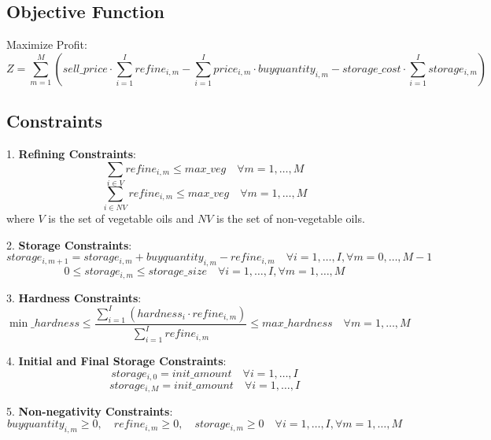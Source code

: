 \documentclass{article}
\begin{document}
\subsection*{Objective Function}

Maximize Profit:
\[
Z = \sum_{m=1}^{M} \left( sell\_price \cdot \sum_{i=1}^{I} refine_{i,m} - \sum_{i=1}^{I} price_{i,m} \cdot buyquantity_{i,m} - storage\_cost \cdot \sum_{i=1}^{I} storage_{i,m} \right)
\]

\subsection*{Constraints}

1. \textbf{Refining Constraints}:
   \[
   \sum_{i \in V} refine_{i,m} \leq max\_veg \quad \forall m = 1,\ldots,M
   \]
   \[
   \sum_{i \in NV} refine_{i,m} \leq max\_veg \quad \forall m = 1,\ldots,M
   \]
   where \( V \) is the set of vegetable oils and \( NV \) is the set of non-vegetable oils.

2. \textbf{Storage Constraints}:
   \[
   storage_{i,m+1} = storage_{i,m} + buyquantity_{i,m} - refine_{i,m} \quad \forall i=1,\ldots,I , \forall m=0,\ldots,M-1
   \]
   \[
   0 \leq storage_{i,m} \leq storage\_size \quad \forall i=1,\ldots,I , \forall m=1,\ldots,M
   \]

3. \textbf{Hardness Constraints}:
   \[
   \min\_hardness \leq \frac{\sum_{i=1}^{I} (hardness_{i} \cdot refine_{i,m})}{\sum_{i=1}^{I} refine_{i,m}} \leq max\_hardness \quad \forall m=1,\ldots,M
   \]

4. \textbf{Initial and Final Storage Constraints}:
   \[
   storage_{i,0} = init\_amount \quad \forall i=1,\ldots,I 
   \]
   \[
   storage_{i,M} = init\_amount \quad \forall i=1,\ldots,I
   \]

5. \textbf{Non-negativity Constraints}:
   \[
   buyquantity_{i,m} \geq 0, \quad refine_{i,m} \geq 0, \quad storage_{i,m} \geq 0 \quad \forall i=1,\ldots,I , \forall m=1,\ldots,M
   \]
\end{document}
